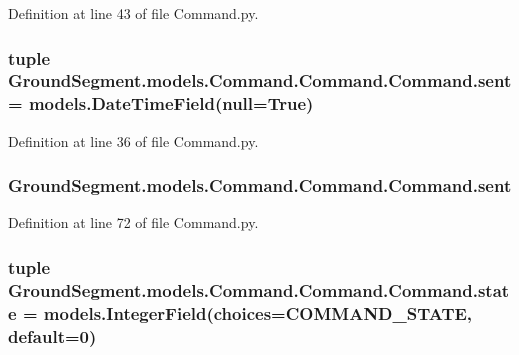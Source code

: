 Definition at line 43 of file Command.\+py.

\hypertarget{class_ground_segment_1_1models_1_1_command_1_1_command_1_1_command_a7bb120290e66f9a1d4f9d1427c896d93}{}
\subsubsection[{sent}]{\setlength{\rightskip}{0pt plus 5cm}tuple Ground\+Segment.\+models.\+Command.\+Command.\+Command.\+sent = models.\+Date\+Time\+Field(null=True)\hspace{0.3cm}{\ttfamily [static]}}\label{class_ground_segment_1_1models_1_1_command_1_1_command_1_1_command_a7bb120290e66f9a1d4f9d1427c896d93}


Definition at line 36 of file Command.\+py.

\hypertarget{class_ground_segment_1_1models_1_1_command_1_1_command_1_1_command_ae2419eab6196f3574e530cf0d63fca06}{}
\subsubsection[{sent}]{\setlength{\rightskip}{0pt plus 5cm}Ground\+Segment.\+models.\+Command.\+Command.\+Command.\+sent}\label{class_ground_segment_1_1models_1_1_command_1_1_command_1_1_command_ae2419eab6196f3574e530cf0d63fca06}


Definition at line 72 of file Command.\+py.

\hypertarget{class_ground_segment_1_1models_1_1_command_1_1_command_1_1_command_af56e8c0eb67228f4f1b20a3495b7751d}{}
\subsubsection[{state}]{\setlength{\rightskip}{0pt plus 5cm}tuple Ground\+Segment.\+models.\+Command.\+Command.\+Command.\+state = models.\+Integer\+Field(choices={\bf C\+O\+M\+M\+A\+N\+D\+\_\+\+S\+T\+A\+T\+E}, default=0)\hspace{0.3cm}{\ttfamily [static]}}\label{class_ground_segment_1_1models_1_1_command_1_1_command_1_1_command_af56e8c0eb67228f4f1b20a3495b7751d}


